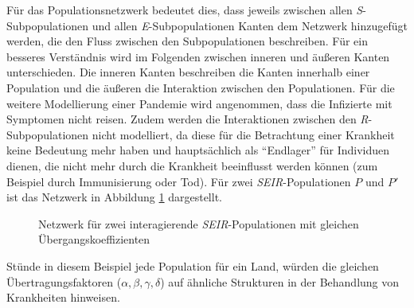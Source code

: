 Für das Populationsnetzwerk bedeutet dies, dass jeweils zwischen allen \emph{S}-Subpopulationen und allen \emph{E}-Subpopulationen Kanten dem Netzwerk hinzugefügt werden, die den Fluss zwischen den Subpopulationen beschreiben. Für ein besseres Verständnis wird im Folgenden zwischen inneren und äußeren Kanten unterschieden. Die inneren Kanten beschreiben die Kanten innerhalb einer Population und die äußeren die Interaktion zwischen den Populationen. Für die weitere Modellierung einer Pandemie wird angenommen, dass die Infizierte mit Symptomen nicht reisen. Zudem werden die Interaktionen zwischen den \emph{R}-Subpopulationen nicht modelliert, da diese für die Betrachtung einer Krankheit keine Bedeutung mehr haben und hauptsächlich als ``Endlager'' für Individuen dienen, die nicht mehr durch die Krankheit beeinflusst werden können (zum Beispiel durch Immunisierung oder Tod). Für zwei \emph{SEIR}-Populationen $P$ und $P'$ ist das Netzwerk in Abbildung \ref{fig:ssec:multiPop:2interactingSEIR} dargestellt. 
\begin{figure}
\begin{center}
\end{center}
\caption{Netzwerk für zwei interagierende \emph{SEIR}-Populationen mit gleichen Übergangskoeffizienten}\label{fig:ssec:multiPop:2interactingSEIR}
\end{figure}

Stünde in diesem Beispiel jede Population für ein Land, würden die gleichen Übertragungsfaktoren ($\alpha, \beta, \gamma, \delta$) auf ähnliche Strukturen in der Behandlung von Krankheiten hinweisen.

